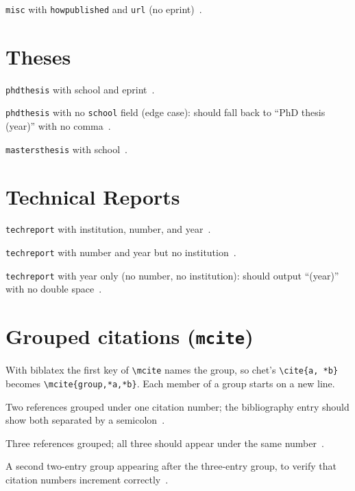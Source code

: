 \documentclass[12pt]{article}
\begin{document}
\texttt{misc} with \texttt{howpublished} and \texttt{url} (no eprint)~\cite{misc_howpublished}.

\section{Theses}

\texttt{phdthesis} with school and eprint~\cite{phdthesis_full}.

\texttt{phdthesis} with no \texttt{school} field (edge case): should fall back to ``PhD thesis (year)'' with no comma~\cite{phdthesis_noschool}.

\texttt{mastersthesis} with school~\cite{mastersthesis_example}.

\section{Technical Reports}

\texttt{techreport} with institution, number, and year~\cite{techreport_full}.

\texttt{techreport} with number and year but no institution~\cite{techreport_no_institution}.

\texttt{techreport} with year only (no number, no institution): should output ``(year)'' with no double space~\cite{techreport_year_only}.

\section{Grouped citations (\texttt{mcite})}

With biblatex the first key of \verb|\mcite| names the group, so chet's \verb|\cite{a, *b}| becomes \verb|\mcite{group,*a,*b}|. Each member of a group starts on a new line.

Two references grouped under one citation number; the bibliography entry should show both separated by a semicolon~.

Three references grouped; all three should appear under the same number~.

A second two-entry group appearing after the three-entry group, to verify that citation numbers increment correctly~.

\printbibliography
\end{document}
